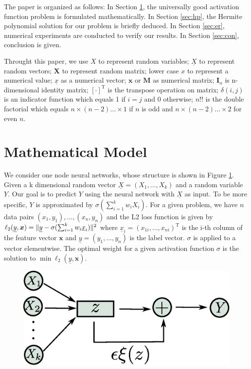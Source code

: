 \documentclass[conference,letterpaper]{IEEEtran}
\DeclarePairedDelimiter\norm{\lVert}{\rVert}
\def\T{\mathrm{T}}
\begin{document}
The paper is organized as follows: In Section \ref{sec:mm}, the universally good activation function problem
is formulated mathematically.
In Section \ref{sec:hp}, the Hermite polynomial solution for our problem is briefly deduced.
In Section \ref{sec:er}, numerical experiments are conducted to verify our results.
In Section \ref{sec:con}, conclusion is given.

Throught this paper, we use $X$ to represent random variables;
$\underline{X}$ to represent random vectors;
$\bm{X}$ to represent random matrix;
lower case $x$ to represent a numerical value;
$\underline{x}$ as a numerical vector;
$\bm{x}$  or $\mathbf{M}$ as numerical matrix; $\mathbf{I}_n$ is n-dimensional identity matrix; 
$[\cdot]^\T$ is the transpose operation on matrix; $\delta(i, j)$ is an indicator function
which equals 1 if $ i = j$ and 0 otherwise; 
$n!!$ is the double factorial which equals $n \times (n-2) \dots \times1$ if $n$ is odd and $n \times (n-2)\dots \times 2$ for even $n$.

\section{Mathematical Model}\label{sec:mm}
We consider one node neural networks, whose structure is shown in Figure \ref{fig:ns}.
Given a k dimensional random vector $\underline{X}=(X_1, \dots, X_k)$ and a random variable $Y$.
Our goal is to predict $Y$ using the neural network with $\underline{X}$ as input.
To be more specific, $Y$ is approximated by $ \sigma(\sum_{i=1}^k w_i X_i)$.
For a given problem, we have $n$ data pairs $(x_1, y_1), \dots, (x_n, y_n)$ and
the L2 loss function is given by
$\ell_2(\underline{y}, \bm{x}) = \norm{\underline{y} - \sigma(\sum_{i=1}^k w_i \underline{x}_i)}^2 $
where $\underline{x}_i= (x_{1i}, \dots, x_{ni})^\T$ is the i-th column of the feature vector $\bm{x}$ and
$\underline{y} = (y_1, \dots, y_n)$ is the label vector. $\sigma$ is applied to a vector elementwise.
The optimal weight for a given activation function $\sigma$ is the solution to $\min \ell_2(\underline{y}, \bm{x})$.

\begin{figure}\label{fig:ns}
\includegraphics[width=\linewidth]{network_structure.eps}
\end{figure}
\end{document}
